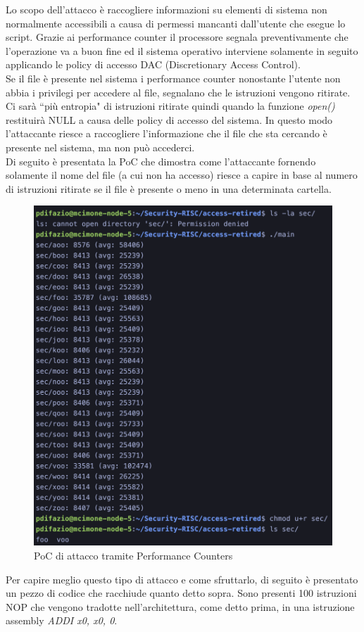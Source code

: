 Lo scopo dell'attacco è raccogliere informazioni su elementi di sistema non normalmente accessibili a causa di permessi mancanti dall'utente che esegue lo script. Grazie ai performance counter il processore segnala preventivamente che l'operazione va a buon fine ed il sistema operativo interviene solamente in seguito applicando le policy di accesso DAC (Discretionary Access Control).\\
Se il file è presente nel sistema i performance counter nonostante l'utente non abbia i privilegi per accedere al file, segnalano che le istruzioni vengono ritirate. Ci sarà ``più entropia" di istruzioni ritirate quindi quando la funzione \textit{open()} restituirà NULL a causa delle policy di accesso del sistema. In questo modo l'attaccante riesce a raccogliere l'informazione che il file che sta cercando è presente nel sistema, ma non può accederci.\\
Di seguito è presentata la PoC che dimostra come l'attaccante fornendo solamente il nome del file (a cui non ha accesso) riesce a capire in base al numero di istruzioni ritirate se il file è presente o meno in una determinata cartella.
\FloatBarrier
\vspace{1cm}
\begin{figure}[!htbp]
    \centering
    \includegraphics[width=0.5\linewidth]{images/access-retired.png}
    \caption{PoC di attacco tramite Performance Counters}
\end{figure}
\vspace{1cm}
\FloatBarrier
Per capire meglio questo tipo di attacco e come sfruttarlo, di seguito è presentato un pezzo di codice che racchiude quanto detto sopra. Sono presenti 100 istruzioni NOP che vengono tradotte nell'architettura, come detto prima, in una istruzione assembly \textit{ADDI x0, x0, 0}.\\
